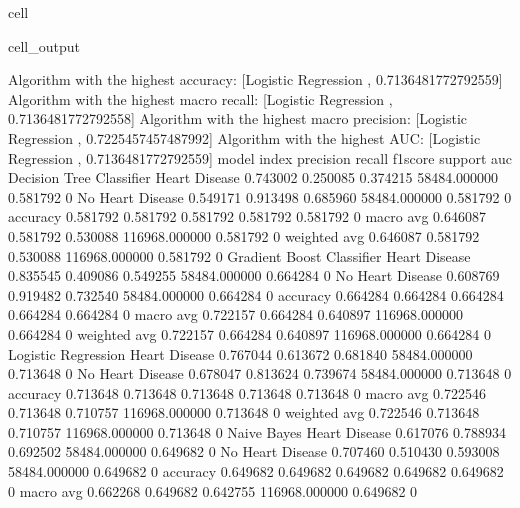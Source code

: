 \documentclass[letterpaper,10pt,english]{jupyterBook}
\begin{document}
\begin{sphinxuseclass}{cell}
\begin{sphinxVerbatimOutput}
\begin{sphinxuseclass}{cell_output}
\begin{sphinxVerbatim}[commandchars=\\\{\}]
Algorithm with the highest accuracy: [\PYGZsq{}Logistic Regression \PYGZsq{}, 0.7136481772792559]
Algorithm with the highest macro recall:
        [\PYGZsq{}Logistic Regression \PYGZsq{}, 0.7136481772792558]
Algorithm with the highest macro precision:
        [\PYGZsq{}Logistic Regression \PYGZsq{}, 0.7225457457487992]
Algorithm with the highest AUC:
        [\PYGZsq{}Logistic Regression \PYGZsq{}, 0.7136481772792559]
model                      index             precision  recall    f1\PYGZhy{}score  support        auc     
Decision Tree Classifier   Heart Disease     0.743002   0.250085  0.374215  58484.000000   0.581792    0
                           No Heart Disease  0.549171   0.913498  0.685960  58484.000000   0.581792    0
                           accuracy          0.581792   0.581792  0.581792  0.581792       0.581792    0
                           macro avg         0.646087   0.581792  0.530088  116968.000000  0.581792    0
                           weighted avg      0.646087   0.581792  0.530088  116968.000000  0.581792    0
Gradient Boost Classifier  Heart Disease     0.835545   0.409086  0.549255  58484.000000   0.664284    0
                           No Heart Disease  0.608769   0.919482  0.732540  58484.000000   0.664284    0
                           accuracy          0.664284   0.664284  0.664284  0.664284       0.664284    0
                           macro avg         0.722157   0.664284  0.640897  116968.000000  0.664284    0
                           weighted avg      0.722157   0.664284  0.640897  116968.000000  0.664284    0
Logistic Regression        Heart Disease     0.767044   0.613672  0.681840  58484.000000   0.713648    0
                           No Heart Disease  0.678047   0.813624  0.739674  58484.000000   0.713648    0
                           accuracy          0.713648   0.713648  0.713648  0.713648       0.713648    0
                           macro avg         0.722546   0.713648  0.710757  116968.000000  0.713648    0
                           weighted avg      0.722546   0.713648  0.710757  116968.000000  0.713648    0
Naive Bayes                Heart Disease     0.617076   0.788934  0.692502  58484.000000   0.649682    0
                           No Heart Disease  0.707460   0.510430  0.593008  58484.000000   0.649682    0
                           accuracy          0.649682   0.649682  0.649682  0.649682       0.649682    0
                           macro avg         0.662268   0.649682  0.642755  116968.000000  0.649682    0

\end{sphinxVerbatim}
\end{sphinxuseclass}
\end{sphinxVerbatimOutput}
\end{sphinxuseclass}
\end{document}
